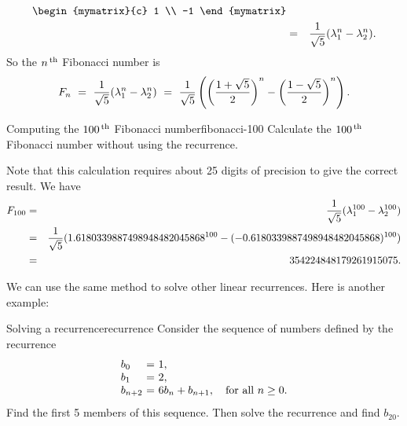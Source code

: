 \begin{solution}
\begin{eqnarray*}
        \begin{mymatrix}{c} 1 \\ -1 \end{mymatrix} \\
    &=& \frac{1}{\sqrt{5}} (\eigenvar_1^n - \eigenvar_2^n).
  \end{eqnarray*}
  So the $n^{\,\rm th}$ Fibonacci number is
  \begin{equation*}
    F_n
    ~=~ \frac{1}{\sqrt{5}} (\lambda_1^n - \lambda_2^n)
    ~=~ \frac{1}{\sqrt{5}}
    \left(\left(\frac{1+\sqrt{5}}{2}\right)^n - \left(\frac{1-\sqrt{5}}{2}\right)^n\right).
  \end{equation*}
\end{solution}

\begin{example}{Computing the $100^{\,\rm th}$ Fibonacci number}{fibonacci-100}
  Calculate the $100^{\,\rm th}$ Fibonacci number without using the recurrence.
\end{example}

\begin{solution}
  Note that this calculation requires about 25 digits of precision to
  give the correct result. We
  have
  \begin{eqnarray*}
    F_{100}
    &=& \frac{1}{\sqrt{5}} (\lambda_1^{100} - \lambda_2^{100}) \\
    &=& \frac{1}{\sqrt{5}} (1.6180339887498948482045868^{100} - (-0.6180339887498948482045868)^{100}) \\
    &=& 354224848179261915075.
  \end{eqnarray*}
\end{solution}

We can use the same method to solve other linear recurrences. Here is
another example:

\begin{example}{Solving a recurrence}{recurrence}
  Consider the sequence of numbers defined by the recurrence
  \begin{equation*}
    \begin{array}{l@{~}c@{~}l}
      b_0 &=& 1, \\
      b_1 &=& 2, \\
      b_{n+2} &=& 6b_{n} + b_{n+1}, \quad\mbox{for all $n\geq 0$.}\\
    \end{array}
  \end{equation*}
  Find the first 5 members of this sequence. Then solve the recurrence
  and find $b_{20}$.
\end{example}

